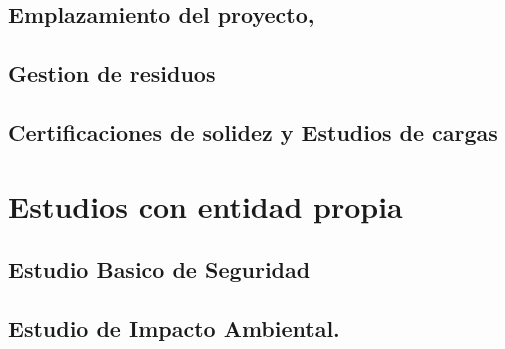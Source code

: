 \documentclass{article}
\newcommand{\path}{../../../assets/settings}
\begin{document}
\subsection{Emplazamiento del proyecto,}
\subsection{Gestion de residuos}
\subsection{Certificaciones de solidez y Estudios de cargas}


\section{Estudios con entidad propia}

\subsection{Estudio Basico de Seguridad}
\subsection{Estudio de Impacto Ambiental.}



% 



\end{document}
